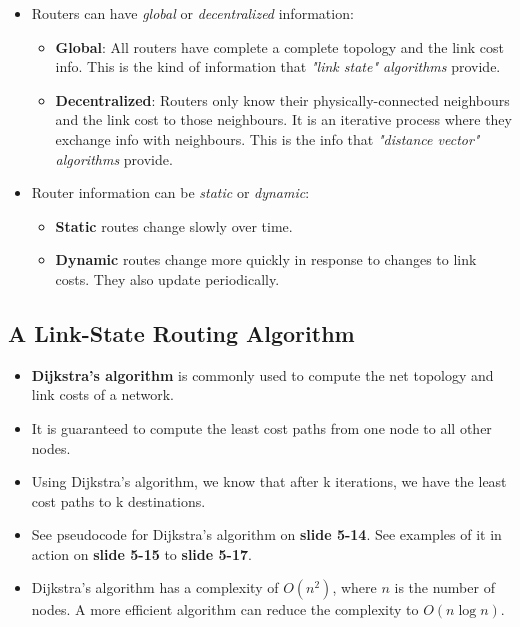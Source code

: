 \documentclass{article}
\begin{document}
\begin{itemize}
\item Routers can have \emph{global} or \emph{decentralized} information:
\begin{itemize}
\item {\bf Global}: All routers have complete a complete topology and the link cost info. This is the kind of information that \emph{"link state" algorithms} provide.
\item {\bf Decentralized}: Routers only know their physically-connected neighbours and the link cost to those neighbours. It is an iterative process where they exchange info with neighbours. This is the info that \emph{"distance vector" algorithms} provide.
\end{itemize}
\item Router information can be \emph{static} or \emph{dynamic}:
\begin{itemize}
\item {\bf Static} routes change slowly over time.
\item {\bf Dynamic} routes change more quickly in response to changes to link costs. They also update periodically.
\end{itemize}
\end{itemize}

\subsection{A Link-State Routing Algorithm}

\begin{itemize}
\item {\bf Dijkstra's algorithm} is commonly used to compute the net topology and link costs of a network.
\item It is guaranteed to compute the least cost paths from one node to all other nodes.
\item Using Dijkstra's algorithm, we know that after k iterations, we have the least cost paths to k destinations.
\item See pseudocode for Dijkstra's algorithm on {\bf slide 5-14}. See examples of it in action on {\bf slide 5-15} to {\bf slide 5-17}.
\item Dijkstra's algorithm has a complexity of $O(n^2)$, where $n$ is the number of nodes. A more efficient algorithm can reduce the complexity to $O(n\log n)$.
\end{itemize}

\end{document}
